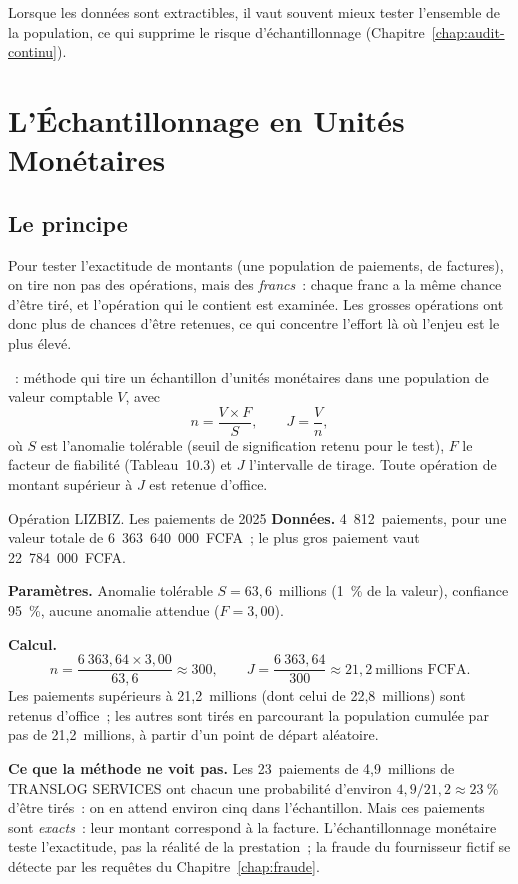 Lorsque les données sont extractibles, il vaut souvent mieux tester
l'ensemble de la population, ce qui supprime le risque d'échantillonnage
(Chapitre~\ref{chap:audit-continu}).

\section{L'Échantillonnage en Unités Monétaires}
\label{sec:c10-mus}

\subsection{Le principe}

Pour tester l'exactitude de montants (une population de paiements, de
factures), on tire non pas des opérations, mais des \emph{francs}~: chaque
franc a la même chance d'être tiré, et l'opération qui le contient est
examinée. Les grosses opérations ont donc plus de chances d'être retenues,
ce qui concentre l'effort là où l'enjeu est le plus élevé.

\begin{boxdef}
~: méthode qui tire un échantillon d'unités monétaires
dans une population de valeur comptable $V$, avec
\[
    n = \frac{V \times F}{S}, \qquad J = \frac{V}{n},
\]
où $S$ est l'anomalie tolérable (seuil de signification retenu pour le
test), $F$ le facteur de fiabilité (Tableau~10.3) et $J$ l'intervalle de
tirage. Toute opération de montant supérieur à $J$ est retenue d'office.
\end{boxdef}

\begin{boxscenario}{Opération LIZBIZ. Les paiements de 2025}
\textbf{Données.} 4~812~paiements, pour une valeur totale de
6~363~640~000~FCFA~; le plus gros paiement vaut 22~784~000~FCFA.

\medskip
\textbf{Paramètres.} Anomalie tolérable $S = 63{,}6$~millions (1~\% de la
valeur), confiance 95~\%, aucune anomalie attendue ($F = 3{,}00$).

\medskip
\textbf{Calcul.}
\[
n = \frac{6~363{,}64 \times 3{,}00}{63{,}6} \approx 300,
\qquad J = \frac{6~363{,}64}{300} \approx 21{,}2~\text{millions FCFA}.
\]
Les paiements supérieurs à 21,2~millions (dont celui de 22,8~millions)
sont retenus d'office~; les autres sont tirés en parcourant la population
cumulée par pas de 21,2~millions, à partir d'un point de départ aléatoire.

\medskip
\textbf{Ce que la méthode ne voit pas.} Les 23~paiements de 4,9~millions
de TRANSLOG SERVICES ont chacun une probabilité d'environ $4{,}9/21{,}2
\approx 23~\%$ d'être tirés~: on en attend environ cinq dans
l'échantillon. Mais ces paiements sont \emph{exacts}~: leur montant
correspond à la facture. L'échantillonnage monétaire teste l'exactitude,
pas la réalité de la prestation~; la fraude du fournisseur fictif se
détecte par les requêtes du Chapitre~\ref{chap:fraude}.
\end{boxscenario}


